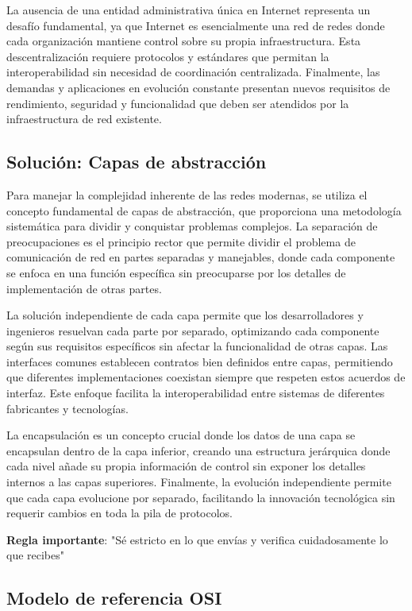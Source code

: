 La ausencia de una entidad administrativa única en Internet representa un desafío fundamental, ya que Internet es esencialmente una red de redes donde cada organización mantiene control sobre su propia infraestructura. Esta descentralización requiere protocolos y estándares que permitan la interoperabilidad sin necesidad de coordinación centralizada. Finalmente, las demandas y aplicaciones en evolución constante presentan nuevos requisitos de rendimiento, seguridad y funcionalidad que deben ser atendidos por la infraestructura de red existente.

\subsection{Solución: Capas de abstracción}

Para manejar la complejidad inherente de las redes modernas, se utiliza el concepto fundamental de capas de abstracción, que proporciona una metodología sistemática para dividir y conquistar problemas complejos. La separación de preocupaciones es el principio rector que permite dividir el problema de comunicación de red en partes separadas y manejables, donde cada componente se enfoca en una función específica sin preocuparse por los detalles de implementación de otras partes.

La solución independiente de cada capa permite que los desarrolladores y ingenieros resuelvan cada parte por separado, optimizando cada componente según sus requisitos específicos sin afectar la funcionalidad de otras capas. Las interfaces comunes establecen contratos bien definidos entre capas, permitiendo que diferentes implementaciones coexistan siempre que respeten estos acuerdos de interfaz. Este enfoque facilita la interoperabilidad entre sistemas de diferentes fabricantes y tecnologías.

La encapsulación es un concepto crucial donde los datos de una capa se encapsulan dentro de la capa inferior, creando una estructura jerárquica donde cada nivel añade su propia información de control sin exponer los detalles internos a las capas superiores. Finalmente, la evolución independiente permite que cada capa evolucione por separado, facilitando la innovación tecnológica sin requerir cambios en toda la pila de protocolos.

\textbf{Regla importante}: "Sé estricto en lo que envías y verifica cuidadosamente lo que recibes"

\subsection{Modelo de referencia OSI}

